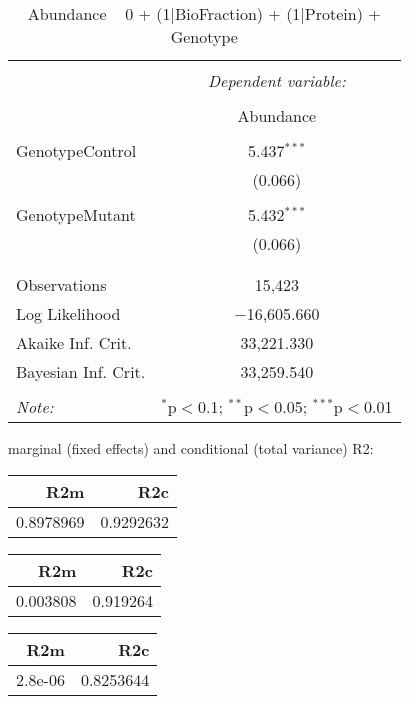 \documentclass[11pt]{report}
\begin{document}
\begin{table}[!htbp] \centering 
  \caption{Abundance ~ 0 + (1|BioFraction) + (1|Protein) + Genotype} 
  \label{} 
\begin{tabular}{@{\extracolsep{5pt}}lc} 
\\[-1.8ex]\hline 
\hline \\[-1.8ex] 
 & \multicolumn{1}{c}{\textit{Dependent variable:}} \\ 
\cline{2-2} 
\\[-1.8ex] & Abundance \\ 
\hline \\[-1.8ex] 
 GenotypeControl & 5.437$^{***}$ \\ 
  & (0.066) \\ 
  & \\ 
 GenotypeMutant & 5.432$^{***}$ \\ 
  & (0.066) \\ 
  & \\ 
\hline \\[-1.8ex] 
Observations & 15,423 \\ 
Log Likelihood & $-$16,605.660 \\ 
Akaike Inf. Crit. & 33,221.330 \\ 
Bayesian Inf. Crit. & 33,259.540 \\ 
\hline 
\hline \\[-1.8ex] 
\textit{Note:}  & \multicolumn{1}{r}{$^{*}$p$<$0.1; $^{**}$p$<$0.05; $^{***}$p$<$0.01} \\ 
\end{tabular} 
\end{table} 
marginal (fixed effects) and conditional (total variance) R2:

\begin{tabular}{r|r}
\hline
R2m & R2c\\
\hline
0.8978969 & 0.9292632\\
\hline
\end{tabular}

\begin{tabular}{r|r}
\hline
R2m & R2c\\
\hline
0.003808 & 0.919264\\
\hline
\end{tabular}

\begin{tabular}{r|r}
\hline
R2m & R2c\\
\hline
2.8e-06 & 0.8253644\\
\hline
\end{tabular}
\end{document}
